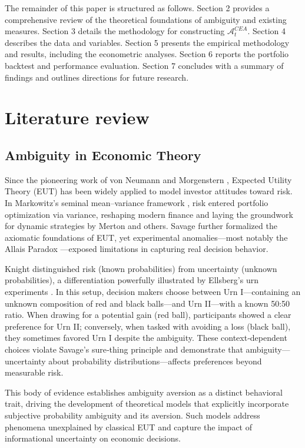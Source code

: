 \documentclass[preprint,12pt,authoryear]{elsarticle}
\begin{document}
The remainder of this paper is structured as follows. Section 2 provides a comprehensive review of the theoretical foundations of ambiguity and existing measures. Section 3 details the methodology for constructing $\mathcal{A}^{CEA}_t$. Section 4 describes the data and variables. Section 5 presents the empirical methodology and results, including the econometric analyses. Section 6 reports the portfolio backtest and performance evaluation. Section 7 concludes with a summary of findings and outlines directions for future research.

\section{Literature review}

\subsection{Ambiguity in Economic Theory}
Since the pioneering work of von Neumann and Morgenstern \cite{neumann1947}, Expected Utility Theory (EUT) has been widely applied to model investor attitudes toward risk. In Markowitz's seminal mean–variance framework \cite{markowitz1952}, risk entered portfolio optimization via variance, reshaping modern finance and laying the groundwork for dynamic strategies by Merton \cite{merton1971} and others. Savage \cite{savage1954} further formalized the axiomatic foundations of EUT, yet experimental anomalies—most notably the Allais Paradox \cite{allais1953}—exposed limitations in capturing real decision behavior.

Knight \cite{knight1921} distinguished risk (known probabilities) from uncertainty (unknown probabilities), a differentiation powerfully illustrated by Ellsberg's urn experiments \cite{ellsberg1961}. In this setup, decision makers choose between Urn I—containing an unknown composition of red and black balls—and Urn II—with a known 50:50 ratio. When drawing for a potential gain (red ball), participants showed a clear preference for Urn II; conversely, when tasked with avoiding a loss (black ball), they sometimes favored Urn I despite the ambiguity. These context‑dependent choices violate Savage's sure‑thing principle and demonstrate that ambiguity—uncertainty about probability distributions—affects preferences beyond measurable risk.

This body of evidence establishes ambiguity aversion as a distinct behavioral trait, driving the development of theoretical models that explicitly incorporate subjective probability ambiguity and its aversion. Such models address phenomena unexplained by classical EUT and capture the impact of informational uncertainty on economic decisions.
\end{document}
